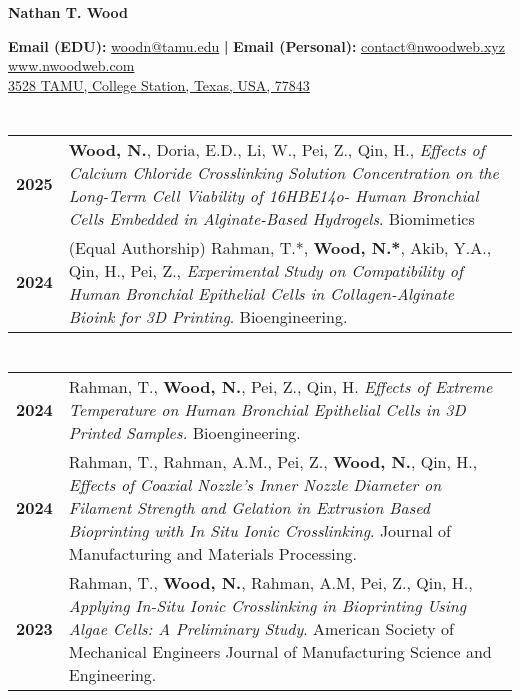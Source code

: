 \documentclass[11pt]{article}
\makeatletter
\def \fullname{Nathan T. Wood}
\def \mail {\href{mailto:woodn@tamu.edu}{woodn@tamu.edu}}
\def \mailalt {\href{mailto:contact@nwoodweb.xyz}{contact@nwoodweb.xyz}}
\def \website {\href{www.nwoodweb.com}{www.nwoodweb.com}}
\def \address {\href{https://www.bio.tamu.edu/}
{3528 TAMU, College Station, Texas, USA, 77843}}
\makeatother
\begin{document}
\begin{center}
	\huge{\textcolor{primary}{\textbf{\fullname}} \\}
\end{center}

\begin{center}
        \small{
                \textbf{Email (EDU):} {{{\mail}} \textbf{|}} 
                \textbf{Email (Personal):} {\mailalt}	 \\ 
                \website \\ 
                \address 
        }
        \color{secondary}{
                \rule{\textwidth}{.2em}
        }
\end{center}
\section*{\color{secondary}{First Author Publications}}

	\begin{longtable}{p{}p{}}
		\textbf{2025} & \textbf{Wood, N.}, Doria, E.D., Li, W.,
		Pei, Z., Qin, H., \emph{Effects of Calcium Chloride 
		Crosslinking Solution Concentration on the Long-Term
		Cell Viability of 16HBE14o- Human Bronchial Cells
		Embedded in Alginate-Based Hydrogels}. Biomimetics \\ 

		\textbf{2024} & {(Equal Authorship) Rahman, T.*, \textbf{Wood, N.*}, Akib, Y.A.,
                        Qin, H., Pei, Z., \emph{Experimental Study
                        on Compatibility of Human Bronchial 
                        Epithelial Cells in Collagen-Alginate Bioink 
			for 3D Printing}. Bioengineering.}  \\ 
	\end{longtable}
\section*{\color{secondary}{Co-Authored Publications}}
	\begin{longtable}{p{}p{}}
		\textbf{2024} & {Rahman, T., \textbf{Wood, N.}, Pei, Z.,
		Qin, H. \emph{Effects of Extreme Temperature on Human Bronchial
		Epithelial Cells in 3D Printed Samples.} Bioengineering.} \\ 
 		\textbf{2024} & {Rahman, T., Rahman, A.M., Pei, Z., \textbf{Wood, N.},
		Qin, H., \emph{Effects of Coaxial Nozzle's Inner Nozzle Diameter on
		Filament Strength and Gelation in Extrusion Based Bioprinting
		with In Situ Ionic Crosslinking}. Journal of Manufacturing and Materials
		Processing.} \\ 
		\textbf{2023} & {Rahman, T., \textbf{Wood, N.}, Rahman, A.M,
			Pei, Z., Qin, H., \emph{Applying In-Situ Ionic Crosslinking
			in Bioprinting Using Algae Cells: A Preliminary Study}. American
			Society of Mechanical Engineers Journal of Manufacturing Science 
			and Engineering.} \\ 
        \end{longtable}
\end{document}
